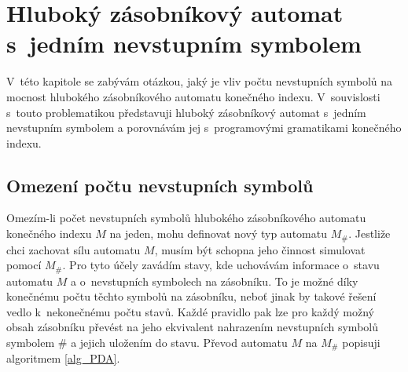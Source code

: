 \chapter{Hluboký zásobníkový automat s~jedním nevstupním symbolem} \label{kap_deep_pda_fin}


V~této kapitole se zabývám otázkou, jaký je vliv počtu nevstupních symbolů na mocnost hlubokého zásobníkového automatu konečného indexu. V~souvislosti s~touto problematikou představuji hluboký zásobníkový automat s~jedním nevstupním symbolem a porovnávám jej s~programovými gramatikami konečného indexu.

\section{Omezení počtu nevstupních symbolů}\label{section_deep_pda_nonterm}


Omezím-li počet nevstupních symbolů hlubokého zásobníkového automatu konečného indexu $M$ na jeden, mohu definovat nový typ automatu $M_\#$. Jestliže chci zachovat sílu automatu $M$, musím být schopna jeho činnost simulovat pomocí $M_\#$. Pro tyto účely zavádím stavy, kde uchovávám informace o~stavu automatu $M$ a o~nevstupních symbolech na zásobníku. To je možné díky konečnému počtu těchto symbolů na zásobníku, neboť jinak by takové řešení vedlo k~nekonečnému počtu stavů. Každé pravidlo pak lze pro každý možný obsah zásobníku převést na jeho ekvivalent nahrazením nevstupních symbolů symbolem $\#$ a jejich uložením do stavu. Převod automatu $M$ na  $M_\#$ popisuji algoritmem \ref{alg_PDA}.

